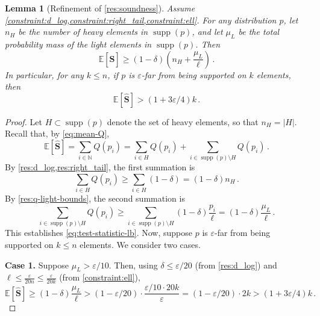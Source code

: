 \documentclass[10pt,a4paper]{article}
\newtheorem{lemma}{Lemma}[section]
\DeclareMathOperator{\supp}{supp}   %
\newcommand{\Ex}[1]{\bE \left[ #1 \right]}
\newcommand{\bE}{\ensuremath{\mathbb{E}}}
\newcommand{\bN}{\ensuremath{\mathbb{N}}}
\renewcommand{\epsilon}{\varepsilon}
\begin{document}
\begin{lemma}[Refinement of \cref{res:soundness}]
    \label{res:soundness-refinement}
    Assume \cref{constraint:d_log,constraint:right_tail,constraint:ell}. For any distribution $p$,
    let $n_H$ be the number of heavy elements in $\supp(p)$, and let $\mu_L$ be the total
    probability mass of the light elements in $\supp(p)$. Then
    \begin{equation}
        \label{eq:test-statistic-lb}
        \Ex{\bm{\widehat S}} \ge (1-\delta) \left( n_H + \frac{\mu_L}{\ell} \right) \,.
    \end{equation}
    In particular, for any $k \leq n$, if $p$ is $\epsilon$-far from being supported on $k$
    elements, then
    \[
        \Ex{\bm{\widehat S}} > (1 + 3\epsilon/4) k \,.
    \]
\end{lemma}
\begin{proof}
    Let $H \subset \supp(p)$ denote the set of heavy elements, so that $n_H = |H|$. Recall that, by
    \eqref{eq:mean-Q},
    \[
        \Ex{\bm{\widehat S}}
        = \sum_{i \in \bN} Q(p_i)
        = \sum_{i \in H} Q(p_i) + \sum_{i \in \supp(p) \setminus H} Q(p_i) \,.
    \]
    By \cref{res:d_log,res:right_tail}, the first summation is
    \[
        \sum_{i \in H} Q(p_i)
        \ge \sum_{i \in H} (1-\delta)
        = (1-\delta) n_H \,.
    \]
    By \cref{res:q-light-bounds}, the second summation is
    \[
        \sum_{i \in \supp(p) \setminus H} Q(p_i)
        \ge \sum_{i \in \supp(p) \setminus H} (1-\delta) \frac{p_i}{\ell}
        = (1-\delta) \frac{\mu_L}{\ell} \,.
    \]
    This establishes \eqref{eq:test-statistic-lb}. Now, suppose $p$ is $\epsilon$-far from being
    supported on $k \le n$ elements. We consider two cases.

    \textbf{Case 1.} Suppose $\mu_L > \epsilon/10$. Then, using $\delta \le \epsilon/20$ (from
    \cref{res:d_log}) and $\ell \le \frac{\epsilon}{20n} \leq \frac{\epsilon}{20k}$
    (from \cref{constraint:ell}),
    \[
        \Ex{\bm{\widehat S}}
        \ge (1-\delta) \frac{\mu_L}{\ell}
        > (1 - \epsilon/20) \cdot \frac{\epsilon/10 \cdot 20k}{\epsilon}
        = (1 - \epsilon/20) \cdot 2k
        > (1 + 3\epsilon/4) k \,.
    \]


\end{proof}
\end{document}
